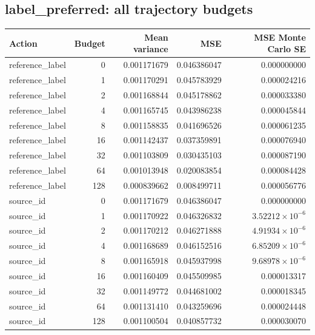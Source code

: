 \reservetable
\subsection{label\_preferred: all trajectory budgets}

\begingroup\small
\setlength{\tabcolsep}{4pt}
\begin{longtable}{lrrrr}
\toprule

Action & Budget & Mean variance & MSE & MSE Monte Carlo SE\\\midrule\endhead

reference\_label & 0 & 0.001171679 & 0.046386047 & 0.000000000\\

reference\_label & 1 & 0.001170291 & 0.045783929 & 0.000024216\\

reference\_label & 2 & 0.001168844 & 0.045178862 & 0.000033380\\

reference\_label & 4 & 0.001165745 & 0.043986238 & 0.000045844\\

reference\_label & 8 & 0.001158835 & 0.041696526 & 0.000061235\\

reference\_label & 16 & 0.001142437 & 0.037359891 & 0.000076940\\

reference\_label & 32 & 0.001103809 & 0.030435103 & 0.000087190\\

reference\_label & 64 & 0.001013948 & 0.020083854 & 0.000084428\\

reference\_label & 128 & 0.000839662 & 0.008499711 & 0.000056776\\

source\_id & 0 & 0.001171679 & 0.046386047 & 0.000000000\\

source\_id & 1 & 0.001170922 & 0.046326832 & $3.52212\times10^{-6}$\\

source\_id & 2 & 0.001170212 & 0.046271888 & $4.91934\times10^{-6}$\\

source\_id & 4 & 0.001168689 & 0.046152516 & $6.85209\times10^{-6}$\\

source\_id & 8 & 0.001165918 & 0.045937998 & $9.68978\times10^{-6}$\\

source\_id & 16 & 0.001160409 & 0.045509985 & 0.000013317\\

source\_id & 32 & 0.001149772 & 0.044681002 & 0.000018345\\

source\_id & 64 & 0.001131410 & 0.043259696 & 0.000024448\\

source\_id & 128 & 0.001100504 & 0.040857732 & 0.000030070\\

\bottomrule
\end{longtable}
\endgroup

